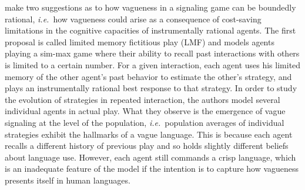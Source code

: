 \documentclass[a4paper]{article}
\begin{document}
\textcite{franke_vagueness_2011} make two suggestions as to how vagueness in a signaling game can be boundedly rational, \emph{i.e.}~how vagueness could arise as a consequence of cost-saving limitations in the cognitive capacities of instrumentally rational agents.
The first proposal is called limited memory fictitious play (LMF) and models agents playing a sim-max game where their ability to recall past interactions with others is limited to a certain number.
For a given interaction, each agent uses his limited memory of the other agent's past behavior to estimate the other's strategy, and plays an instrumentally rational best response to that strategy.
In order to study the evolution of strategies in repeated interaction, the authors model several individual agents in actual play.
What they observe is the emergence of vague signaling at the level of the population, \emph{i.e.}~population averages of individual strategies exhibit the hallmarks of a vague language.
This is because each agent recalls a different history of previous play and so holds slightly different beliefs about language use.
However, each agent still commands a crisp language, which is an inadequate feature of the model if the intention is to capture how vagueness presents itself in human languages.
\end{document}
